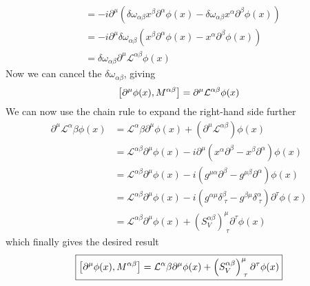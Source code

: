 \documentclass[12pt]{article}
\begin{document}
\begin{enumerate}[label=(\alph*)]
\begin{align*}
        &= -i\partial^\mu\left(\delta\omega_{\alpha\beta}x^\beta\partial^\alpha\phi(x) - \delta\omega_{\alpha\beta}x^\alpha\partial^\beta\phi(x)\right) \\
        &= -i\partial^\mu\delta\omega_{\alpha\beta}\left(x^\beta\partial^\alpha\phi(x) - x^\alpha\partial^\beta\phi(x)\right) \\
        &= \delta\omega_{\alpha\beta}\partial^\mu\mathcal{L}^{\alpha\beta}\phi(x)
    \end{align*}
    Now we can cancel the $\delta\omega_{\alpha\beta}$, giving
    \[ \comm{\partial^\mu\phi(x)}{M^{\alpha\beta}} = \partial^\mu\mathcal{L}^{\alpha\beta}\phi(x) \]
    We can now use the chain rule to expand the right-hand side further
    \begin{align*}
        \partial^\mu\mathcal{L}^\alpha\beta\phi(x) &= \mathcal{L}^\alpha\beta\partial^\mu\phi(x) + \left(\partial^\mu\mathcal{L}^{\alpha\beta}\right)\phi(x) \\
        &= \mathcal{L}^{\alpha\beta}\partial^\mu\phi(x) -i\partial^\mu\left(x^\alpha\partial^\beta - x^\beta\partial^\alpha\right)\phi(x) \\
        &= \mathcal{L}^{\alpha\beta}\partial^\mu\phi(x) -i\left(g^{\mu\alpha}\partial^\beta - g^{\mu\beta}\partial^\alpha\right)\phi(x) \\
        &= \mathcal{L}^{\alpha\beta}\partial^\mu\phi(x) -i\left(g^{\alpha\mu}\delta_{\;\tau}^\beta - g^{\beta\mu}\delta_{\;\tau}^\alpha\right)\partial^\tau\phi(x) \\
        &= \mathcal{L}^{\alpha\beta}\partial^\mu\phi(x) + \left(S_V^{\alpha\beta}\right)_{\;\tau}^{\mu}\partial^\tau\phi(x)
    \end{align*}
    which finally gives the desired result
    \[ \boxed{\comm{\partial^\mu\phi(x)}{M^{\alpha\beta}} = \mathcal{L}^\alpha\beta\partial^\mu\phi(x) + \left(S_V^{\alpha\beta}\right)_{\;\tau}^{\mu}\partial^\tau\phi(x)} \]


\end{enumerate}
\end{document}
